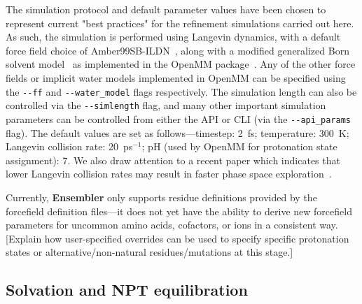 \documentclass[aps,pre,twocolumn,nofootinbib,superscriptaddress,linenumbers]{revtex4-1}
\begin{document}
The simulation protocol and default parameter values have been chosen to represent current "best practices" for the refinement simulations carried out here.
As such, the simulation is performed using Langevin dynamics, with a default force field choice of Amber99SB-ILDN~\cite{amber99sb-ildn}, along with a modified generalized Born solvent model~\cite{gbsa-obc1} as implemented in the OpenMM package~\cite{eastman:jctc:2012:openmm}.
Any of the other force fields or implicit water models implemented in OpenMM can be specified using the {\tt -{}-ff} and {\tt -{}-water\_model} flags respectively.
The simulation length can also be controlled via the {\tt -{}-simlength} flag, and many other important simulation parameters can be controlled from either the API or CLI (via the {\tt -{}-api\_params} flag).
The default values are set as follows---timestep: 2~fs; temperature: 300~K; Langevin collision rate: 20~ps$^{-1}$; pH (used by OpenMM for protonation state assignment): 7.
We also draw attention to a recent paper which indicates that lower Langevin collision rates may result in faster phase space exploration~\cite{basconi:jctc:2013:collision-rates}.

\color{red}
Currently, {\bf Ensembler} only supports residue definitions provided by the forcefield definition files---it does not yet have the ability to derive new forcefield parameters for uncommon amino acids, cofactors, or ions in a consistent way.
\color{orange}
[Explain how user-specified overrides can be used to specify specific protonation states or alternative/non-natural residues/mutations at this stage.]
\color{black}

\subsection{Solvation and NPT equilibration}
\end{document}
